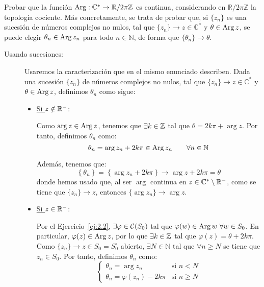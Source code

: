 \begin{ejercicio}
    Probar que la función $\operatorname{Arg} : \mathbb{C}^\ast \to \mathbb{R}/2\pi\mathbb{Z}$ es continua, considerando en $\mathbb{R}/2\pi\mathbb{Z}$ la topología cociente. Más concretamente, se trata de probar que, si $\{z_n\}$ es una sucesión de números complejos no nulos, tal que $\{z_n\} \to z \in \mathbb{C}^\ast$ y $\theta \in \operatorname{Arg} z$, se puede elegir $\theta_n \in \operatorname{Arg} z_n$ para todo $n \in \mathbb{N}$, de forma que $\{\theta_n\} \to \theta$.

    \begin{description}
        \item[Usando sucesiones:] Usaremos la caracterización que en el mismo enunciado describen. Dada una sucesión $\{z_n\}$ de números complejos no nulos, tal que $\{z_n\}\to z\in \mathbb{C}^{\ast}$ y $\theta\in \operatorname{Arg} z$, definimos $\theta_n$ como sigue:
        \begin{itemize}
            \item \ul{Si $z\notin \mathbb{R}^-$}:
            
            Como $\arg z\in \operatorname{Arg} z$, tenemos que $\exists k\in \mathbb{Z}$ tal que $\theta=2k\pi+\arg z$. Por tanto, definimos $\theta_n$ como:
            \begin{equation*}
                \theta_n = \arg z_n + 2k\pi \in \operatorname{Arg} z_n\qquad \forall n\in \mathbb{N}
            \end{equation*}

            Además, tenemos que:
            \begin{equation*}
                \left\{\theta_n\right\} = \left\{\arg z_n + 2k\pi\right\}\to \arg z + 2k\pi = \theta
            \end{equation*}
            donde hemos usado que, al ser $\arg$ continua en $z\in \mathbb{C}^{\ast}\setminus \mathbb{R}^-$, como se tiene que $\{z_n\}\to z$, entonces $\{\arg z_n\}\to \arg z$.
            
            \item \ul{Si $z\in \mathbb{R}^-$}:
            
            Por el Ejercicio~\ref{ej:2.2}, $\exists \varphi\in \mathcal{C}(S_{0})$ tal que $\varphi(w)\in \operatorname{Arg} w~\forall w\in S_{0}$. En particular, $\varphi(z)\in \operatorname{Arg} z$, por lo que $\exists k\in \mathbb{Z}$ tal que $\varphi(z)=\theta+2k\pi$.\\

            Como $\{z_n\}\to z\in S_0=S_0^\circ$ abierto, $\exists N\in \mathbb{N}$ tal que $\forall n\geq N$ se tiene que $z_n\in S_{0}$. Por tanto, definimos $\theta_n$ como:
            \begin{equation*}
                \begin{cases}
                    \theta_n = \arg z_n & \text{si } n<N\\
                    \theta_n = \varphi(z_n)-2k\pi & \text{si } n\geq N
                \end{cases}
            \end{equation*}


\end{itemize}
\end{description}
\end{ejercicio}
